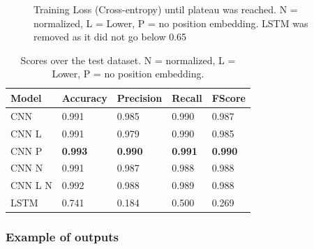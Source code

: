 \documentclass{jdmdh}
\begin{document}
\begin{figure}[!ht]
  \begin{center}
    \caption{Training Loss (Cross-entropy) until plateau was reached. N = normalized, L = Lower, P = no position embedding. LSTM was removed as it did not go below 0.65}
  \label{fig:loss}
  \end{center}
\end{figure}

\begin{table}[!ht]
\centering
\begin{tabular}{lllll}
\hline
Model   & Accuracy & Precision & Recall & FScore \\ \hline
CNN     & 0.991    & 0.985     & 0.990  & 0.987  \\
CNN L   & 0.991    & 0.979     & 0.990  & 0.985  \\
CNN P   & \textbf{0.993}    & \textbf{0.990}& \textbf{0.991}  & \textbf{0.990}  \\
CNN N   & 0.991    & 0.987     & 0.988  & 0.988  \\
CNN L N & 0.992    & 0.988     & 0.989  & 0.988  \\
LSTM    & 0.741    & 0.184     & 0.500  & 0.269  \\ \hline
\end{tabular}
\caption{Scores over the test dataset. N = normalized, L = Lower, P = no position embedding.}
\label{tab:scores}
\end{table}

\subsubsection{Example of outputs}
\end{document}
